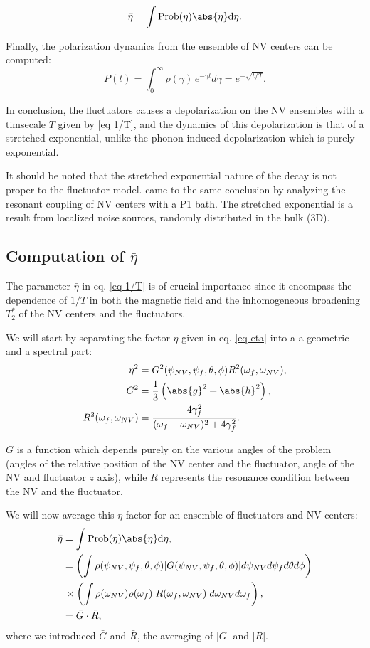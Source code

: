\documentclass[a4paper,11pt]{report}
\begin{document}
\begin{refsection}
\begin{equation}
\bar \eta = \int \rm{Prob}(\eta) \abs{\eta} d\eta.
\end{equation}

Finally, the polarization dynamics from the ensemble of NV centers can be computed:
\begin{equation}
P(t)=\int_0^\infty \rho(\gamma)\, e^{-\gamma t}d\gamma= e^{-\sqrt{t/T}}.
\end{equation}

In conclusion, the fluctuators causes a depolarization on the NV ensembles with a timsecale $T$ given by \ref{eq 1/T}, and the dynamics of this depolarization is that of a stretched exponential, unlike the phonon-induced depolarization which is purely exponential. 

It should be noted that the stretched exponential nature of the decay is not proper to the fluctuator model. \citep{hall2016detection} came to the same conclusion by analyzing the resonant coupling of NV centers with a P1 bath. The stretched exponential is a result from localized noise sources, randomly distributed in the bulk (3D).

\subsection{Computation of $\bar \eta$}
\label{sec computation eta}
The parameter $\bar \eta$ in eq. \ref{eq 1/T} is of crucial importance since it encompass the dependence of $1/T$ in both the magnetic field and the inhomogeneous broadening $T_2^*$ of the NV centers and the fluctuators.

We will start by separating the factor $\eta$ given in eq. \ref{eq eta} into a a geometric and a spectral part:
\begin{align}
\eta^2&=G^2(\psi_{NV},\psi_f,\theta,\phi) R^2(\omega_f,\omega_{NV}), \\
G^2&=\frac{1}{3}\left(\abs{g}^2+\abs{h}^2 \right),  \\ 
R^2(\omega_f,\omega_{NV}) &= \frac{4\gamma_f^2}{(\omega_f - \omega_{NV})^2+4\gamma_f^2}.
\end{align}

$G$ is a function which depends purely on the various angles of the problem (angles of the relative position of the NV center and the fluctuator, angle of the NV and fluctuator $z$ axis), while $R$ represents the resonance condition between the NV and the fluctuator.

We will now average this $\eta$ factor for an ensemble of fluctuators and NV centers:
\begin{align*}
\bar \eta &= \int \rm{Prob}(\eta) \abs{\eta} d\eta, \\
&= \left(\int \rho(\psi_{NV},\psi_f,\theta,\phi) |G(\psi_{NV},\psi_f,\theta,\phi)| d\psi_{NV} d\psi_f d\theta d\phi \right) \\
&\, \times \left( \int \rho(\omega_{NV}) \rho(\omega_{f}) |R(\omega_f,\omega_{NV})| d\omega_{NV} d\omega_{f} \right), \\
&= \bar G \cdot \bar R,
\end{align*}
where we introduced $\bar G$ and $\bar R$, the averaging of $|G|$ and $|R|$.


\end{refsection}
\end{document}
